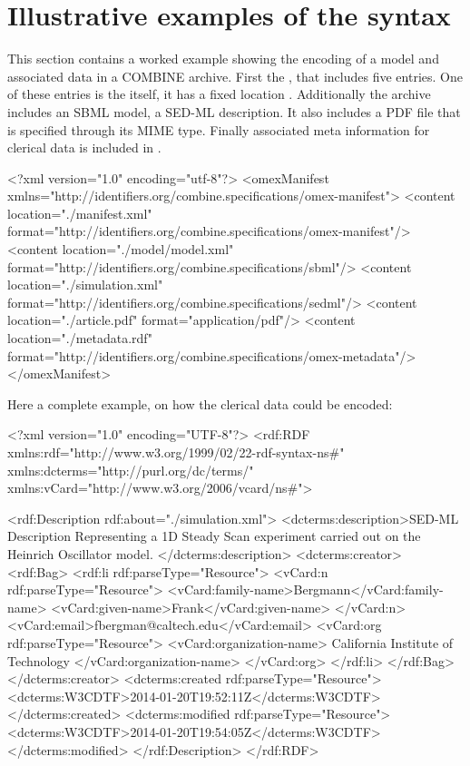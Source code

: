 
\section{Illustrative examples of the syntax}
\label{examples}

This section contains a worked example showing the encoding of a model 
and associated data in a COMBINE archive. First the \OmexManifest, that 
includes five entries. One of these entries is the \OmexManifest itself, 
it has a fixed location . Additionally 
the archive includes an SBML model, a SED-ML description. It also 
includes a PDF file that is specified through its MIME type. Finally 
associated meta information for clerical data is included in 
. 


\begin{example}
<?xml version="1.0" encoding="utf-8"?>
<omexManifest xmlns="http://identifiers.org/combine.specifications/omex-manifest">
    <content location="./manifest.xml" 
		         format="http://identifiers.org/combine.specifications/omex-manifest"/>
    <content location="./model/model.xml" 
		         format="http://identifiers.org/combine.specifications/sbml"/>
    <content location="./simulation.xml" 
		         format="http://identifiers.org/combine.specifications/sedml"/>
    <content location="./article.pdf" 
		         format="application/pdf"/>
    <content location="./metadata.rdf" 
		         format="http://identifiers.org/combine.specifications/omex-metadata"/>
</omexManifest>
\end{example}

Here a complete example, on how the clerical data could be encoded: 

\begin{example}
<?xml version="1.0" encoding="UTF-8"?>
<rdf:RDF xmlns:rdf="http://www.w3.org/1999/02/22-rdf-syntax-ns#" 
         xmlns:dcterms="http://purl.org/dc/terms/" 
				 xmlns:vCard="http://www.w3.org/2006/vcard/ns#">

   <rdf:Description rdf:about="./simulation.xml">
      <dcterms:description>SED-ML Description Representing a 1D Steady Scan 
			   experiment carried out on the Heinrich Oscillator model. 
			</dcterms:description>
      <dcterms:creator>
         <rdf:Bag>
            <rdf:li rdf:parseType="Resource">
               <vCard:n rdf:parseType="Resource">
                  <vCard:family-name>Bergmann</vCard:family-name>
                  <vCard:given-name>Frank</vCard:given-name>
               </vCard:n>
               <vCard:email>fbergman@caltech.edu</vCard:email>
               <vCard:org rdf:parseType="Resource">
                  <vCard:organization-name>
									  California Institute of Technology
									</vCard:organization-name>
               </vCard:org>
            </rdf:li>
         </rdf:Bag>
      </dcterms:creator>
      <dcterms:created rdf:parseType="Resource">
         <dcterms:W3CDTF>2014-01-20T19:52:11Z</dcterms:W3CDTF>
      </dcterms:created>
      <dcterms:modified rdf:parseType="Resource">
         <dcterms:W3CDTF>2014-01-20T19:54:05Z</dcterms:W3CDTF>
      </dcterms:modified>
   </rdf:Description>
</rdf:RDF>
\end{example}